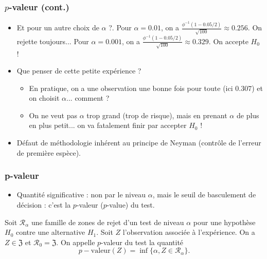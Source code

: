 \begin{frame}
\frametitle{$p$-valeur (cont.)}
\begin{itemize}
\item \alert{Et pour un autre choix de $\alpha$ ?}. Pour $\alpha=0.01$, on a $\frac{\phi^{-1}(1-0.05/2)}{\sqrt{100}} \approx 0.256$. On rejette toujours... Pour $\alpha=0.001$, on a $\frac{\phi^{-1}(1-0.05/2)}{\sqrt{100}} \approx 0.329$. \alert{On accepte $H_0$ !}
\item Que penser de cette petite expérience ?
\begin{itemize}
\item En pratique, on a une observation une bonne fois pour toute (ici $0.307$) et on  choisit  $\alpha$... \alert{comment ?}
\item On ne veut pas $\alpha$ trop grand (trop de risque), mais en prenant $\alpha$ de plus en plus petit... on va \alert{ fatalement} finir par accepter $H_0$ !
\end{itemize}
\item Défaut de méthodologie inhérent au principe de Neyman (contrôle de l'erreur de première espèce).
\end{itemize}
\end{frame}


\begin{frame}
\frametitle{p-valeur}
\begin{itemize}
\item Quantité \alert{significative} : non par le niveau $\alpha$, mais le \alert{seuil de basculement de décision} : c'est la $p$-valeur ($p$-value) du test.
\end{itemize}
\begin{df}
Soit ${\mathcal R}_\alpha$ une famille de zones de rejet d'un test de niveau $\alpha$ pour une hypothèse $H_0$ contre une alternative $H_1$. Soit $Z$ l'observation associée à l'expérience. On a $Z \in \mathfrak{Z}$ et ${\mathcal R}_0 = \mathfrak{Z}$.
On appelle \alert{$p$-valeur du test} la quantité
$$p-\text{valeur}(Z) = \inf\{\alpha, Z \in {\mathcal R}_\alpha\}.$$
\end{df}
\end{frame}


